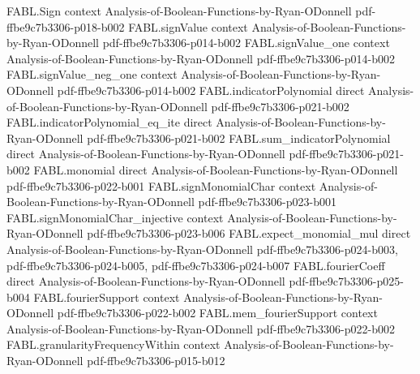 \begin{theorem}
\label{FABL.fourierWeightAtLevel_majority_next_odd_lt}
\leanok
{}
\proofstep
  {FABL.Sign}
  {context}
  {Analysis-of-Boolean-Functions-by-Ryan-ODonnell}
  {pdf-ffbe9c7b3306-p018-b002}
\proofstep
  {FABL.signValue}
  {context}
  {Analysis-of-Boolean-Functions-by-Ryan-ODonnell}
  {pdf-ffbe9c7b3306-p014-b002}
\proofstep
  {FABL.signValue_one}
  {context}
  {Analysis-of-Boolean-Functions-by-Ryan-ODonnell}
  {pdf-ffbe9c7b3306-p014-b002}
\proofstep
  {FABL.signValue_neg_one}
  {context}
  {Analysis-of-Boolean-Functions-by-Ryan-ODonnell}
  {pdf-ffbe9c7b3306-p014-b002}
\proofstep
  {FABL.indicatorPolynomial}
  {direct}
  {Analysis-of-Boolean-Functions-by-Ryan-ODonnell}
  {pdf-ffbe9c7b3306-p021-b002}
\proofstep
  {FABL.indicatorPolynomial_eq_ite}
  {direct}
  {Analysis-of-Boolean-Functions-by-Ryan-ODonnell}
  {pdf-ffbe9c7b3306-p021-b002}
\proofstep
  {FABL.sum_indicatorPolynomial}
  {direct}
  {Analysis-of-Boolean-Functions-by-Ryan-ODonnell}
  {pdf-ffbe9c7b3306-p021-b002}
\proofstep
  {FABL.monomial}
  {direct}
  {Analysis-of-Boolean-Functions-by-Ryan-ODonnell}
  {pdf-ffbe9c7b3306-p022-b001}
\proofstep
  {FABL.signMonomialChar}
  {context}
  {Analysis-of-Boolean-Functions-by-Ryan-ODonnell}
  {pdf-ffbe9c7b3306-p023-b001}
\proofstep
  {FABL.signMonomialChar_injective}
  {context}
  {Analysis-of-Boolean-Functions-by-Ryan-ODonnell}
  {pdf-ffbe9c7b3306-p023-b006}
\proofstep
  {FABL.expect_monomial_mul}
  {direct}
  {Analysis-of-Boolean-Functions-by-Ryan-ODonnell}
  {pdf-ffbe9c7b3306-p024-b003,
    pdf-ffbe9c7b3306-p024-b005,
    pdf-ffbe9c7b3306-p024-b007}
\proofstep
  {FABL.fourierCoeff}
  {direct}
  {Analysis-of-Boolean-Functions-by-Ryan-ODonnell}
  {pdf-ffbe9c7b3306-p025-b004}
\proofstep
  {FABL.fourierSupport}
  {context}
  {Analysis-of-Boolean-Functions-by-Ryan-ODonnell}
  {pdf-ffbe9c7b3306-p022-b002}
\proofstep
  {FABL.mem_fourierSupport}
  {context}
  {Analysis-of-Boolean-Functions-by-Ryan-ODonnell}
  {pdf-ffbe9c7b3306-p022-b002}
\proofstep
  {FABL.granularityFrequencyWithin}
  {context}
  {Analysis-of-Boolean-Functions-by-Ryan-ODonnell}
  {pdf-ffbe9c7b3306-p015-b012}

\end{theorem}
